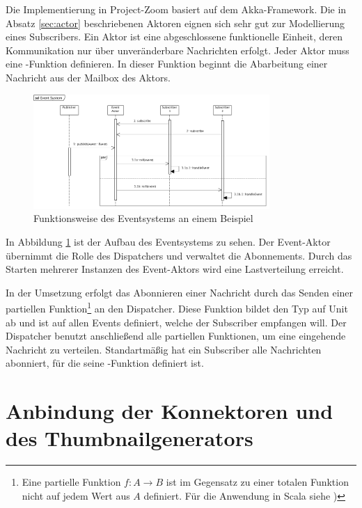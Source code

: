 Die Implementierung in Project-Zoom basiert auf dem Akka-Framework. Die in Absatz \ref{sec:actor} beschriebenen Aktoren eignen sich sehr gut zur Modellierung eines Subscribers. Ein Aktor ist eine abgeschlossene funktionelle Einheit, deren Kommunikation nur über unveränderbare Nachrichten erfolgt. Jeder Aktor muss eine -Funktion definieren. In dieser Funktion beginnt die Abarbeitung einer Nachricht aus der Mailbox des Aktors. 

\begin{figure}[h]  
  \centering     
  \includegraphics[width=0.8\textwidth]{img/event_system.png}  
   \caption{Funktionsweise des Eventsystems an einem Beispiel}   
  \label{fig:event-system} 
\end{figure}

In Abbildung \ref{fig:event-system} ist der Aufbau des Eventsystems zu sehen. Der Event-Aktor übernimmt die Rolle des Dispatchers und verwaltet die Abonnements. Durch das Starten mehrerer Instanzen des Event-Aktors wird eine Lastverteilung erreicht.

In der Umsetzung erfolgt das Abonnieren einer Nachricht durch das Senden einer partiellen Funktion\footnote{Eine partielle Funktion $f: A \rightarrow B$ ist im Gegensatz zu einer totalen Funktion nicht auf jedem Wert aus $A$ definiert. Für die Anwendung in Scala siehe \cite{partial-function})} an den Dispatcher. Diese Funktion bildet den Typ  auf Unit ab und ist auf allen Events definiert, welche der Subscriber empfangen will. Der Dispatcher benutzt anschließend alle partiellen Funktionen, um eine eingehende Nachricht zu verteilen. Standartmäßig hat ein Subscriber alle Nachrichten abonniert, für die seine -Funktion definiert ist.

\section{Anbindung der Konnektoren und des Thumbnailgenerators}
